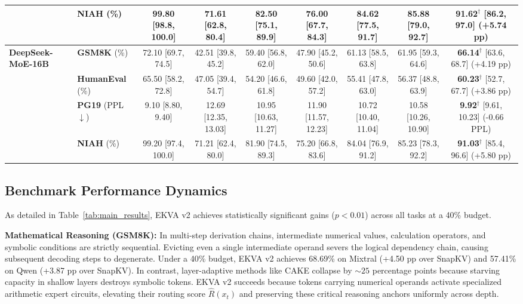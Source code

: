 \documentclass[conference]{IEEEtran}
\begin{document}
\begin{table}[t]
{\begin{tabular}{llccccccc}
& \textbf{NIAH} (\%)                   & 99.80 [98.8, 100.0]& 71.61 [62.8, 80.4] & 82.50 [75.1, 89.9] & 76.00 [67.7, 84.3] & 84.62 [77.5, 91.7] & 85.88 [79.0, 92.7] & \textbf{91.62}$^\dagger$ [86.2, 97.0] (+5.74 pp) \\
\midrule
\multirow{4}{*}{\textbf{DeepSeek-MoE-16B}} 
& \textbf{GSM8K} (\%)                  & 72.10 [69.7, 74.5] & 42.51 [39.8, 45.2] & 59.40 [56.8, 62.0] & 47.90 [45.2, 50.6] & 61.13 [58.5, 63.8] & 61.95 [59.3, 64.6] & \textbf{66.14}$^\dagger$ [63.6, 68.7] (+4.19 pp) \\
& \textbf{HumanEval} (\%)              & 65.50 [58.2, 72.8] & 47.05 [39.4, 54.7] & 54.20 [46.6, 61.8] & 49.60 [42.0, 57.2] & 55.41 [47.8, 63.0] & 56.37 [48.8, 63.9] & \textbf{60.23}$^\dagger$ [52.7, 67.7] (+3.86 pp) \\
& \textbf{PG19} (PPL $\downarrow$)     & 9.10 [8.80, 9.40]   & 12.69 [12.35, 13.03]& 10.95 [10.63, 11.27] & 11.90 [11.57, 12.23] & 10.72 [10.40, 11.04] & 10.58 [10.26, 10.90] & \textbf{9.92}$^\dagger$ [9.61, 10.23] (-0.66 PPL) \\
& \textbf{NIAH} (\%)                   & 99.20 [97.4, 100.0]& 71.21 [62.4, 80.0] & 81.90 [74.5, 89.3] & 75.20 [66.8, 83.6] & 84.04 [76.9, 91.2] & 85.23 [78.3, 92.2] & \textbf{91.03}$^\dagger$ [85.4, 96.6] (+5.80 pp) \\
\bottomrule
\end{tabular}
}
\end{table}

\subsection{Benchmark Performance Dynamics}
As detailed in Table~\ref{tab:main_results}, EKVA v2 achieves statistically significant gains ($p < 0.01$) across all tasks at a 40\% budget. 

\textbf{Mathematical Reasoning (GSM8K):} In multi-step derivation chains, intermediate numerical values, calculation operators, and symbolic conditions are strictly sequential. Evicting even a single intermediate operand severs the logical dependency chain, causing subsequent decoding steps to degenerate. Under a 40\% budget, EKVA v2 achieves 68.69\% on Mixtral (+4.50 pp over SnapKV) and 57.41\% on Qwen (+3.87 pp over SnapKV). In contrast, layer-adaptive methods like CAKE collapse by $\sim 25$ percentage points because starving capacity in shallow layers destroys symbolic tokens. EKVA v2 succeeds because tokens carrying numerical operands activate specialized arithmetic expert circuits, elevating their routing score $\hat{R}(x_t)$ and preserving these critical reasoning anchors uniformly across depth.
\end{document}

